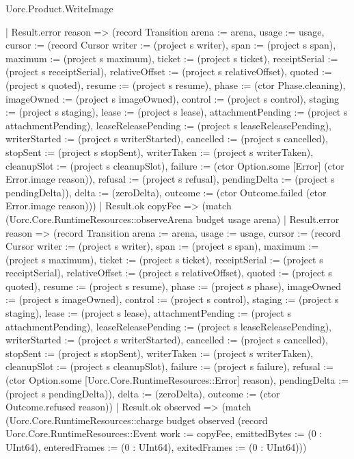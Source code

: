 \begin{lexlean}{Uorc.Product.WriteImage}
\begin{semanticmodule}
{        | Result.error reason => (record Transition {arena := arena, usage := usage, cursor := (record Cursor {writer := (project s writer), span := (project s span), maximum := (project s maximum), ticket := (project s ticket), receiptSerial := (project s receiptSerial), relativeOffset := (project s relativeOffset), quoted := (project s quoted), resume := (project s resume), phase := (ctor Phase.cleaning), imageOwned := (project s imageOwned), control := (project s control), staging := (project s staging), lease := (project s lease), attachmentPending := (project s attachmentPending), leaseReleasePending := (project s leaseReleasePending), writerStarted := (project s writerStarted), cancelled := (project s cancelled), stopSent := (project s stopSent), writerTaken := (project s writerTaken), cleanupSlot := (project s cleanupSlot), failure := (ctor Option.some [Error] (ctor Error.image reason)), refusal := (project s refusal), pendingDelta := (project s pendingDelta)}), delta := (zeroDelta), outcome := (ctor Outcome.failed (ctor Error.image reason))})
        | Result.ok copyFee => (match (Uorc.Core.RuntimeResources::observeArena budget usage arena)
          | Result.error reason => (record Transition {arena := arena, usage := usage, cursor := (record Cursor {writer := (project s writer), span := (project s span), maximum := (project s maximum), ticket := (project s ticket), receiptSerial := (project s receiptSerial), relativeOffset := (project s relativeOffset), quoted := (project s quoted), resume := (project s resume), phase := (project s phase), imageOwned := (project s imageOwned), control := (project s control), staging := (project s staging), lease := (project s lease), attachmentPending := (project s attachmentPending), leaseReleasePending := (project s leaseReleasePending), writerStarted := (project s writerStarted), cancelled := (project s cancelled), stopSent := (project s stopSent), writerTaken := (project s writerTaken), cleanupSlot := (project s cleanupSlot), failure := (project s failure), refusal := (ctor Option.some [Uorc.Core.RuntimeResources::Error] reason), pendingDelta := (project s pendingDelta)}), delta := (zeroDelta), outcome := (ctor Outcome.refused reason)})
          | Result.ok observed => (match (Uorc.Core.RuntimeResources::charge budget observed (record Uorc.Core.RuntimeResources::Event {work := copyFee, emittedBytes := (0 : UInt64), enteredFrames := (0 : UInt64), exitedFrames := (0 : UInt64)}))
}
\end{semanticmodule}
\end{lexlean}

